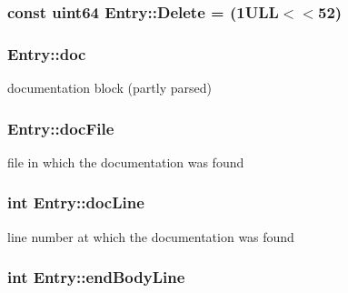 \subsubsection[{Delete}]{\setlength{\rightskip}{0pt plus 5cm}const {\bf uint64} Entry\+::\+Delete = (1\+U\+L\+L$<$$<$52)\hspace{0.3cm}{\ttfamily [static]}}\label{class_entry_a7acc394a520d7dbc506a434baa11b2ff}
\hypertarget{class_entry_ac02a6c1dd922221351f6de0286d48d77}{}
\subsubsection[{doc}]{ Entry\+::doc}\label{class_entry_ac02a6c1dd922221351f6de0286d48d77}


documentation block (partly parsed) 

\hypertarget{class_entry_ac6841c6ec8fd7ae6121364e7e1895e94}{}
\subsubsection[{doc\+File}]{ Entry\+::doc\+File}\label{class_entry_ac6841c6ec8fd7ae6121364e7e1895e94}


file in which the documentation was found 

\hypertarget{class_entry_a180b5fdd7f3b963e4b0d2c4ea6e0b1b5}{}
\subsubsection[{doc\+Line}]{\setlength{\rightskip}{0pt plus 5cm}int Entry\+::doc\+Line}\label{class_entry_a180b5fdd7f3b963e4b0d2c4ea6e0b1b5}


line number at which the documentation was found 

\hypertarget{class_entry_a2db88158279ecfe391ea775f63869fc1}{}
\subsubsection[{end\+Body\+Line}]{\setlength{\rightskip}{0pt plus 5cm}int Entry\+::end\+Body\+Line}\label{class_entry_a2db88158279ecfe391ea775f63869fc1}


